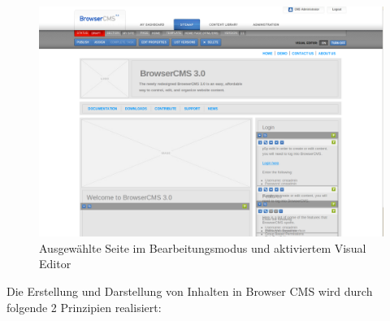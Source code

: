 \begin{figure}[!h]
\begin{center}
\includegraphics[scale=0.3]{images/analyse/browser/frontendangemeldet.png}
\caption{Ausgewählte Seite im Bearbeitungsmodus und aktiviertem Visual Editor}
\label{browserpageedit}
\end{center}
\end{figure}
Die Erstellung und Darstellung von Inhalten in Browser CMS wird durch folgende 2 Prinzipien realisiert:
